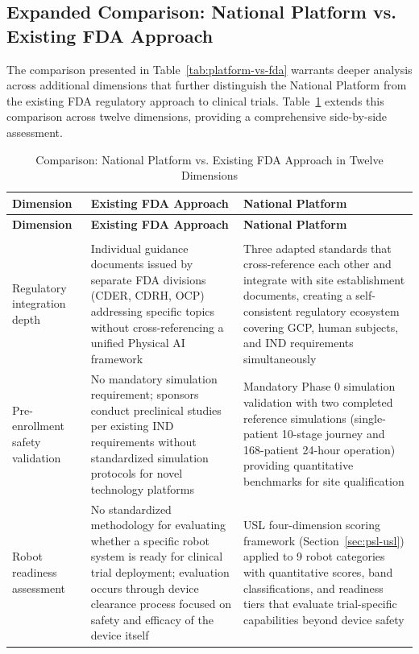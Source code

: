 \subsection{Expanded Comparison: National Platform vs. Existing FDA Approach}
\label{subsec:discuss-expanded-comparison}

The comparison presented in Table~\ref{tab:platform-vs-fda} warrants deeper
analysis across additional dimensions that further distinguish the National
Platform from the existing FDA regulatory approach to clinical trials.
Table~\ref{tab:expanded-platform-vs-fda} extends this comparison across
twelve dimensions, providing a comprehensive side-by-side assessment.

\begin{longtable}{>{\raggedright\arraybackslash}p{3cm} >{\raggedright\arraybackslash}p{6cm} >{\raggedright\arraybackslash}p{7cm}}
\caption{Comparison: National Platform vs. Existing FDA Approach in Twelve Dimensions}
\label{tab:expanded-platform-vs-fda} \\
\toprule
\textbf{Dimension} & \textbf{Existing FDA Approach} & \textbf{National Platform} \\
\midrule
\endfirsthead
\toprule
\textbf{Dimension} & \textbf{Existing FDA Approach} & \textbf{National Platform} \\
\midrule
\endhead
\midrule
\multicolumn{3}{r}{\textit{Continued on next page}} \\
\bottomrule
\endfoot
\bottomrule
\endlastfoot
Regulatory integration depth & Individual guidance documents issued by separate FDA divisions (CDER, CDRH, OCP) addressing specific topics without cross-referencing a unified Physical AI framework & Three adapted standards that cross-reference each other and integrate with site establishment documents, creating a self-consistent regulatory ecosystem covering GCP, human subjects, and IND requirements simultaneously \\
\midrule
Pre-enrollment safety validation & No mandatory simulation requirement; sponsors conduct preclinical studies per existing IND requirements without standardized simulation protocols for novel technology platforms & Mandatory Phase 0 simulation validation with two completed reference simulations (single-patient 10-stage journey and 168-patient 24-hour operation) providing quantitative benchmarks for site qualification \\
\midrule
Robot readiness assessment & No standardized methodology for evaluating whether a specific robot system is ready for clinical trial deployment; evaluation occurs through device clearance process focused on safety and efficacy of the device itself & USL four-dimension scoring framework (Section~\ref{sec:psl-usl}) applied to 9 robot categories with quantitative scores, band classifications, and readiness tiers that evaluate trial-specific capabilities beyond device safety \\

\end{longtable}
